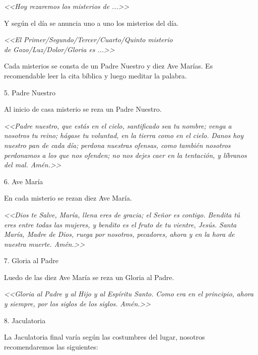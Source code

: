 \documentclass[12pt, letterpaper]{report}
\begin{document}
    \textit{<<Hoy rezaremos los misterios de ...>>}
    
    Y según el día se anuncia uno a uno los misterios del día.

    \textit{<<El Primer/Segundo/Tercer/Cuarto/Quinto misterio\\ de Gozo/Luz/Dolor/Gloria es ...>>}
    
    Cada misterios se consta de un Padre Nuestro y diez Ave Marías. Es recomendable leer la cita bíblica y luego meditar la palabra.

    \LARGE 5. Padre Nuestro
    
    \Large Al inicio de casa misterio se reza un Padre Nuestro.
    
    \textit{<<Padre nuestro, que estás en el cielo, santificado sea tu nombre; venga a nosotros tu reino; hágase tu voluntad, en la tierra como en el cielo. Danos hoy nuestro pan de cada día; perdona nuestras ofensas, como también nosotros perdonamos a los que nos ofenden; no nos dejes caer en la tentación, y líbranos del mal. Amén.>>}
    
    
    \LARGE 6. Ave María
    
    \Large En cada misterio se rezan diez Ave María.
    
    \textit{<<Dios te Salve, María, llena eres de gracia; el Señor es contigo. Bendita tú eres entre todas las mujeres, y bendito es el fruto de tu vientre, Jesús. Santa María, Madre de Dios, ruega por nosotros, pecadores, ahora y en la hora de nuestra muerte. Amén.>>}
    
    
    \LARGE 7. Gloria al Padre
    
    \Large Luedo de las diez Ave María se reza un Gloria al Padre.
    
    \textit{<<Gloria al Padre y al Hijo y al Espíritu Santo. Como era en el principio, ahora y siempre, por los siglos de los siglos. Amén.>>}
    
    \LARGE 8. Jaculatoria
    
    \Large La Jaculatoria final varía según las costumbres del lugar, nosotros recomendaremos las siguientes:
    
\end{document}
